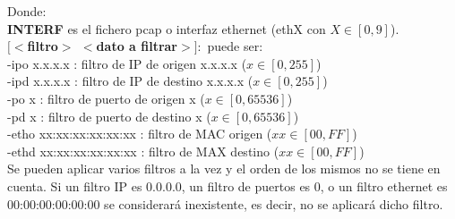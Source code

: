 \documentclass[a4paper, 11pt]{article}	%
\begin{document}
\noindent Donde:\\
\textbf{INTERF} es el fichero pcap o interfaz ethernet (ethX con $X \in [0,9]$).\\
\textbf{$[<$filtro$>$ $<$dato a filtrar$>]:$} puede ser:\\
\indent -ipo x.x.x.x : filtro de IP de origen x.x.x.x ($x \in [0, 255]$)\\
\indent -ipd x.x.x.x : filtro de IP de destino x.x.x.x ($x \in [0, 255]$)\\
\indent -po x : filtro de puerto de origen x ($x \in [0,65536]$)\\
\indent -pd x : filtro de puerto de destino x ($x \in [0,65536]$)\\
\indent -etho xx:xx:xx:xx:xx:xx : filtro de MAC origen ($xx \in [00,FF]$)\\
\indent -ethd xx:xx:xx:xx:xx:xx : filtro de MAX destino ($xx \in [00,FF]$)\\

Se pueden aplicar varios filtros a la vez y el orden de los mismos no se tiene en cuenta.
Si un filtro IP es 0.0.0.0, un filtro de puertos es 0, o un filtro ethernet es 00:00:00:00:00:00 se considerará inexistente, es decir, no se aplicará dicho filtro.
\end{document}
